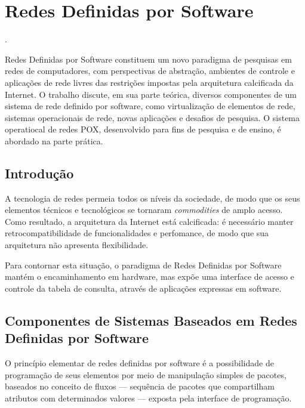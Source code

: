 
\chapter{Redes Definidas por Software}
 \cite{guedes2012sdn}.

Redes Definidas por Software constituem um novo paradigma de pesquisas em redes de computadores, com perspectivas de abstração, ambientes de controle e aplicações de rede livres das restrições impostas pela arquitetura calcificada da Internet. O trabalho discute, em sua parte teórica, diversos componentes de um sistema de rede definido por software, como virtualização de elementos de rede, sistemas operacionais de rede, novas aplicações e desafios de pesquisa. O sistema operatiocal de redes POX, desenvolvido para fins de pesquisa e de ensino, é abordado na parte prática.


\section*{Introdução}

A tecnologia de redes permeia todos os níveis da sociedade, de modo que os seus elementos técnicos e tecnológicos se tornaram \textit{commodities} de amplo acesso. Como resultado, a arquitetura da Internet está calcificada: é necessário manter retrocompatibilidade de funcionalidades e perfomance, de modo que sua arquitetura não apresenta flexibilidade.

Para contornar esta situação, o paradigma de Redes Definidas por Software mantém o encaminhamento em hardware, mas expõe uma interface de acesso e controle da tabela de consulta, através de aplicações expressas em software.


\section*{Componentes de Sistemas Baseados em Redes Definidas por Software}

O princípio elementar de redes definidas por software é a possibilidade de programação de seus elementos por meio de manipulação simples de pacotes, baseados no conceito de fluxos \cite{clark1988design} --- sequência de pacotes que compartilham atributos com determinados valores --- exposta pela interface de programação.

